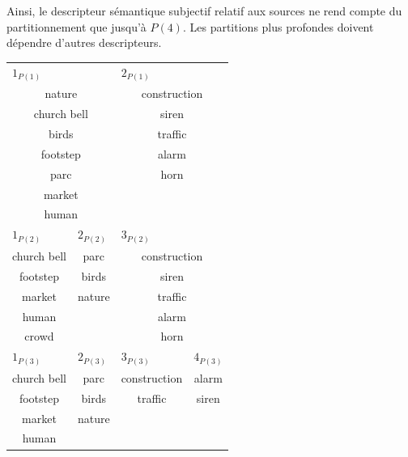 Ainsi, le descripteur sémantique subjectif relatif aux sources ne rend compte du partitionnement que jusqu'à $P(4)$. Les partitions plus profondes doivent dépendre d'autres descripteurs.

\begin{table}[t]
\centering
\tiny
\begin{tabular}{c|c|c|c|c|c|c}
\multicolumn{3}{l|}{$1_{P(1)}$}  & \multicolumn{4}{l}{$2_{P(1)}$} \\
\multicolumn{3}{c|}{nature}      & \multicolumn{4}{c}{construction} \\
\multicolumn{3}{c|}{church bell} & \multicolumn{4}{c}{siren} \\
\multicolumn{3}{c|}{birds}       & \multicolumn{4}{c}{traffic} \\
\multicolumn{3}{c|}{footstep}    & \multicolumn{4}{c}{alarm} \\
\multicolumn{3}{c|}{parc}        & \multicolumn{4}{c}{horn} \\          
\multicolumn{3}{c|}{market}      & \multicolumn{4}{c}{} \\   
\multicolumn{3}{c|}{human}       & \multicolumn{4}{c}{} \\                                    
\hline
\multicolumn{2}{l|}{$1_{P(2)}$}  & \multicolumn{1}{l|}{$2_{P(2)}$} & \multicolumn{4}{l}{$3_{P(2)}$} \\
\multicolumn{2}{c|}{church bell} & parc   & \multicolumn{4}{c}{construction} \\
\multicolumn{2}{c|}{footstep}    & birds  & \multicolumn{4}{c}{siren} \\
\multicolumn{2}{c|}{market}      & nature & \multicolumn{4}{c}{traffic} \\
\multicolumn{2}{c|}{human}       &        & \multicolumn{4}{c}{alarm} \\	
\multicolumn{2}{c|}{crowd}       &        & \multicolumn{4}{c}{horn} \\	
\hline
\multicolumn{2}{l|}{$1_{P(3)}$}  & \multicolumn{1}{l|}{$2_{P(3)}$} & \multicolumn{3}{l|}{$3_{P(3)}$} & \multicolumn{1}{l}{$4_{P(3)}$} \\ 
\multicolumn{2}{c|}{church bell} & parc     & \multicolumn{3}{c|}{construction} & alarm \\         
\multicolumn{2}{c|}{footstep}    & birds    & \multicolumn{3}{c|}{traffic}      & siren\\ 
\multicolumn{2}{c|}{market}      & nature   & \multicolumn{3}{c|}{}             &  \\ 
\multicolumn{2}{c|}{human}       &          & \multicolumn{3}{c|}{}             &  \\            

\end{tabular}
\end{table}
